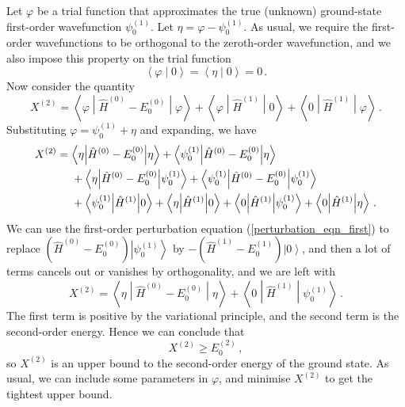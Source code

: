 \documentclass{article}
\theoremstyle{plain}\theoremheaderfont{\normalfont\itshape}\theorembodyfont{\rmfamily}\theoremseparator{.}\newtheorem*{rem}{Remark}\newtheorem*{ex}{Example}\newtheorem*{proof}{Proof}\newtheorem*{altp}{Alternative proof}
\theoremstyle{plain}\theoremheaderfont{\normalfont\bfseries}\theorembodyfont{\rmfamily}\theoremseparator{.}\newtheorem{thm}{Theorem}[section]\newtheorem{lem}[thm]{Lemma}\newtheorem{prop}[thm]{Proposition}\newtheorem*{cor}{Corollary}\newtheorem{defn}[thm]{Definition}\newtheorem{clm}[thm]{Claim}\newtheorem{clminproof}{Claim}
\theoremstyle{break}\theoremheaderfont{\normalfont\itshape}\theorembodyfont{\rmfamily}\theoremseparator{.\medskip}\newtheorem*{proofskip}{Proof}\newtheorem*{exs}{Examples}\newtheorem*{rems}{Remarks}
\theoremstyle{break}\theoremheaderfont{\normalfont\bfseries}\theorembodyfont{\rmfamily}\theoremseparator{.\medskip}\newtheorem{lemskip}[thm]{Lemma}\newtheorem{defnskip}[thm]{Definition}\newtheorem{propskip}[thm]{Proposition}\newtheorem{thmskip}[thm]{Theorem}
\numberwithin{equation}{section}
\newcommand{\ket}[1]{\left| #1 \right\rangle}
\newcommand{\braket}[2]{\left\langle #1 \middle| #2 \right\rangle}
\newcommand{\mel}[3]{\left\langle #1 \middle| #2 \middle| #3 \right\rangle}
\newcommand{\expval}[2]{\left\langle #2 \middle| #1 \middle| #2 \right\rangle}
\begin{document}
    Let \(\varphi\) be a trial function that approximates the true (unknown) ground-state first-order wavefunction \(\psi_0^{(1)}\). Let \(\eta=\varphi-\psi_0^{(1)}\). As usual, we require the first-order wavefunctions to be orthogonal to the zeroth-order wavefunction, and we also impose this property on the trial function
    \begin{equation}
        \braket{\varphi}{0}=\braket{\eta}{0}=0\,.
    \end{equation}
    Now consider the quantity
    \begin{equation}\label{variational_second_order_energy}
        X^{(2)}=\expval{\hat{H}^{(0)}-E_0^{(0)}}{\varphi}+\mel{\varphi}{\hat{H}^{(1)}}{0}+\mel{0}{\hat{H}^{(1)}}{\varphi}\,.
    \end{equation}
    Substituting \(\varphi=\psi_0^{(1)}+\eta\) and expanding, we have
    \begin{align}
        X^{(2)}&=\expval{\hat{H}^{(0)}-E_0^{(0)}}{\eta}+\mel{\psi_0^{(1)}}{\hat{H}^{(0)}-E_0^{(0)}}{\eta}\notag \\
        &\quad\ +\mel{\eta}{\hat{H}^{(0)}-E_0^{(0)}}{\psi_0^{(1)}}+\mel{\psi_0^{(1)}}{\hat{H}^{(0)}-E_0^{(0)}}{\psi_0^{(1)}}\notag \\
        &\quad\ +\mel{\psi_0^{(1)}}{\hat{H}^{(1)}}{0}+\mel{\eta}{\hat{H}^{(1)}}{0}+\mel{0}{\hat{H}^{(1)}}{\psi_0^{(1)}}+\mel{0}{\hat{H}^{(1)}}{\eta}\,.
    \end{align}
    We can use the first-order perturbation equation (\ref{perturbation_eqn_first}) to replace \((\hat{H}^{(0)}-E_0^{(0)})\ket{\psi_0^{(1)}}\) by \(-(\hat{H}^{(1)}-E_0^{(1)})\ket{0}\), and then a lot of terms cancels out or vanishes by orthogonality, and we are left with
    \begin{equation}
        X^{(2)}=\expval{\hat{H}^{(0)}-E_0^{(0)}}{\eta}+\mel{0}{\hat{H}^{(1)}}{\psi_0^{(1)}}\,.
    \end{equation}
    The first term is positive by the variational principle, and the second term is the second-order energy. Hence we can conclude that
    \begin{equation}
        X^{(2)}\ge E_0^{(2)}\,,
    \end{equation}
    so \(X^{(2)}\) is an upper bound to the second-order energy of the ground state. As usual, we can include some parameters in \(\varphi\), and minimise \(X^{(2)}\) to get the tightest upper bound.
\end{document}
